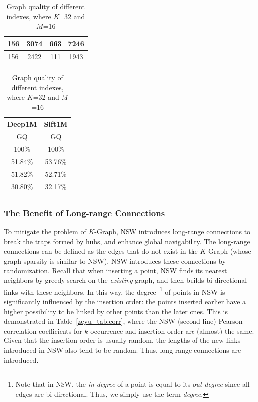 \documentclass[11pt]{article}
\begin{document}
\begin{table}[tb]
\begin{minipage}{.31\linewidth}
\begin{tabular}{cccc}
      156  & 3074 & 663 & 7246 \\ \midrule
    156  & 2422 & 111 & 1943  \\ \bottomrule \\
\end{tabular}   
    \label{zeyu_tab:high-recall}
\end{minipage}%
\hspace{2mm}
\begin{minipage}{.22\linewidth}
    \centering
    \footnotesize
\caption{Graph quality of different indexes, where $K$=32 and $M$=16}
\begin{tabular}{cc}\\
\toprule
          Deep1M & Sift1M \\ \midrule
          GQ & GQ \\\midrule
 100\%  & 100\%  \\ \midrule
 51.84\%  & 53.76\%  \\ \midrule
51.82\%  & 52.71\%  \\ \midrule
30.80\%  & 32.17\%  \\ \bottomrule \\
\end{tabular}
    \label{zeyu_tab:graph-quality}
\end{minipage}%
\end{table}

\subsubsection{The Benefit of Long-range Connections}

To mitigate the problem of $K$-Graph, NSW introduces long-range connections to break the traps formed by hubs, and enhance global navigability.
The long-range connections can be defined as the edges that do not exist in the $K$-Graph (whose graph sparsity is similar to NSW).
NSW introduces these connections by randomization.
Recall that when inserting a point, NSW finds its nearest neighbors by greedy search on the \emph{existing} graph, and then builds bi-directional links with these neighbors.
In this way, the degree~\footnote{Note that in NSW, the \emph{in-degree} of a point is equal to its \emph{out-degree} since all edges are bi-directional. Thus, we simply use the term \emph{degree}.} of points in NSW is significantly influenced by the insertion order: the points inserted earlier have a higher possibility to be linked by other points than the later ones.
This is demonstrated in Table~\ref{zeyu_tab:corr}, where the NSW (second line) Pearson correlation coefficients for $k$-occurrence and insertion order are (almost) the same.  
Given that the insertion order is usually random, the lengths of the new links introduced in NSW also tend to be random.
Thus, long-range connections are introduced.
\end{document}
